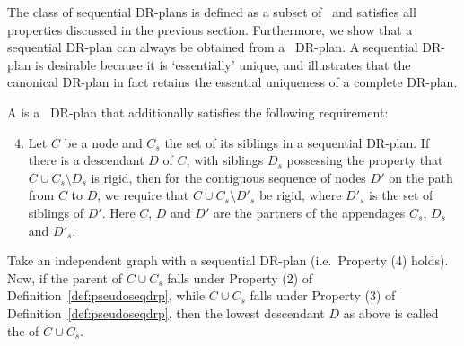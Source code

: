 The class of sequential DR-plans is defined as a subset of \pseudosequential\ and satisfies all properties discussed in the previous section. Furthermore, we show that a sequential DR-plan can always be obtained from a \pseudosequential\ DR-plan. A sequential DR-plan is desirable because it is `essentially' unique, and illustrates that the canonical DR-plan in fact retains the essential uniqueness of a complete DR-plan.

\begin{definition}
\label{def:seqdrp}
    A  is a \pseudosequential\ DR-plan that additionally satisfies the following requirement:

    \begin{enumerate}
        \setcounter{enumi}{3}
        \item Let $C$ be a node and $C_s$ the set of its siblings in a sequential DR-plan. If there is a descendant $D$ of $C$, with siblings $D_s$  possessing the property that $C\cup C_s\setminus D_s$ is rigid, then for the contiguous sequence of nodes $D'$ on the path from $C$ to $D$, we require that $C\cup C_s \setminus D'_s$ be rigid, where $D'_s$ is the set of siblings of $D'$. Here $C$, $D$ and $D'$ are the partners of the appendages $C_s$, $D_s$ and $D'_s$.
    \end{enumerate}

    Take an independent graph with a sequential DR-plan (i.e.\ Property (4) holds). Now, if the parent of $C\cup C_s$ falls under Property (2) of Definition~\ref{def:pseudoseqdrp}, while $C\cup C_s$ falls under Property (3) of Definition~\ref{def:pseudoseqdrp}, then the lowest descendant $D$ as above is called the  of $C\cup C_s$.
\end{definition}

